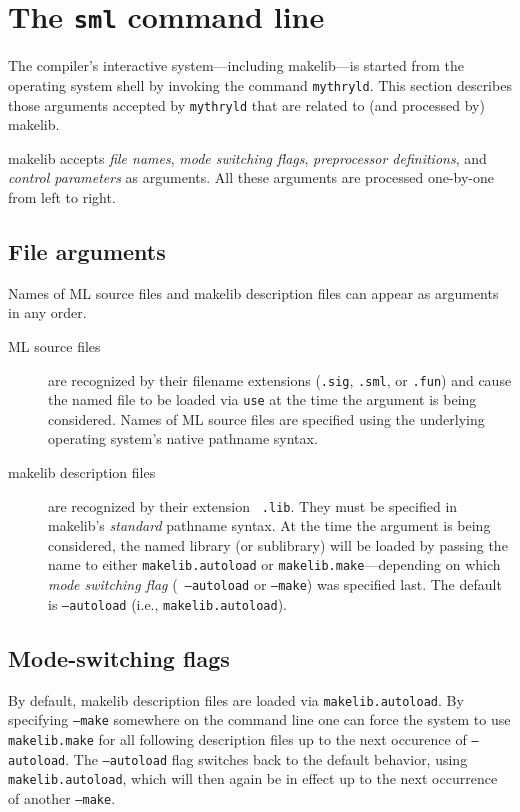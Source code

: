 
\section{The {\tt sml} command line}
\label{sec:cmdline}

The compiler's interactive system---including makelib---is started from the
operating system shell by invoking the command {\tt mythryld}.
This section describes those arguments accepted by {\tt mythryld} that
are related to (and processed by) makelib.

makelib accepts {\em file names}, {\em mode switching flags}, {\em
preprocessor definitions}, and {\em control parameters} as arguments.
All these arguments are processed one-by-one from left to right.

\subsection{File arguments}

Names of ML source files and makelib description files can appear as
arguments in any order.

\begin{description}
\item[ML source files] are recognized by their filename extensions
({\tt .sig}, {\tt .sml}, or {\tt .fun}) and cause the named file to be
loaded via {\tt use} at the time the argument is being considered.
Names of ML source files are specified using the underlying operating
system's native pathname syntax.
\item[makelib description files] are recognized by their extension {\tt
.lib}.  They must be specified in makelib's {\em standard} pathname syntax.
At the time the argument is being considered, the named library (or
sublibrary) will be loaded by passing the name to either {\tt makelib.autoload}
or {\tt makelib.make}---depending on which {\em mode switching flag} ({\tt
--autoload} or {\tt --make}) was specified last.  The default is {\tt --autoload}
(i.e., {\tt makelib.autoload}).
\end{description}

\subsection{Mode-switching flags}

By default, makelib description files are loaded via {\tt makelib.autoload}.  By
specifying {\tt --make} somewhere on the command line one can force the
system to use {\tt makelib.make} for all following description files up to
the next occurence of {\tt --autoload}.  The {\tt --autoload} flag switches
back to the default behavior, using {\tt makelib.autoload}, which will then
again be in effect up to the next occurrence of another {\tt --make}.

